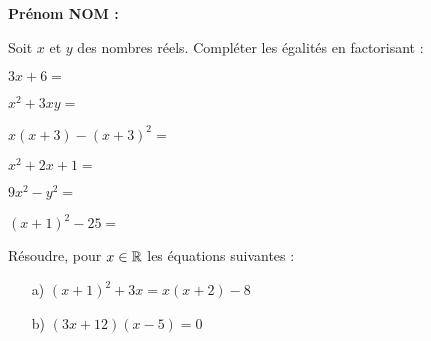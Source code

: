 \documentclass[a4paper,11pt,DIV15,BCOR0mm]{scrartcl}
\begin{document}
\noindent\textbf{Prénom NOM : }
\begin{exercice}
Soit $x$ et $y$ des nombres réels. Compléter les égalités en factorisant :

\vfill
$3x+6 = $ 
\vfill

$x^2+3xy = $
\vfill

$x(x+3)-(x+3)^2 =$
\vfill

$x^2+2x+1=$
\vfill


$9x^2-y^2=$
\vfill

$(x+1)^2-25=$
\vfill


\end{exercice}

\begin{exercice}
Résoudre, pour $x\in\mathbb{R}$ les équations suivantes :
\begin{enumerate}
\item[a)] $(x+1)^2+3x=x(x+2)-8$
\vfill
\vfill
\vfill
\vfill
\vfill
\vfill
\item[b)] $(3x+12)(x-5)=0$
\vfill
\vfill
\vfill
\vfill
\vfill
\vfill
\end{enumerate}
\end{exercice}
\end{document}
